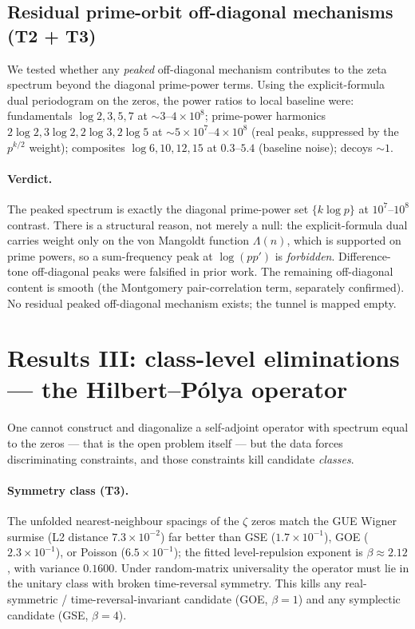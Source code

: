 \documentclass[11pt]{article}
\begin{document}
\subsection{Residual prime-orbit off-diagonal mechanisms (T2 + T3)}
\label{sec:q6}

We tested whether any \emph{peaked} off-diagonal mechanism contributes to the
zeta spectrum beyond the diagonal prime-power terms. Using the explicit-formula dual
periodogram on the zeros, the power ratios to local baseline were: fundamentals
$\log 2,3,5,7$ at $\sim 3$--$4\times10^8$; prime-power harmonics $2\log2,3\log2,2\log3,
2\log5$ at $\sim 5\times10^7$--$4\times10^8$ (real peaks, suppressed by the $p^{k/2}$
weight); composites $\log6,10,12,15$ at $0.3$--$5.4$ (baseline noise); decoys $\sim1$.

\paragraph{Verdict.} The peaked spectrum is exactly the diagonal prime-power set
$\{k\log p\}$ at $10^7$--$10^8$ contrast. There is a structural reason, not merely a
null: the explicit-formula dual carries weight only on the von Mangoldt function
$\Lambda(n)$, which is supported on prime powers, so a sum-frequency peak at
$\log(pp')$ is \emph{forbidden}. Difference-tone off-diagonal peaks were falsified in
prior work. The remaining off-diagonal content is smooth (the Montgomery pair-correlation
term, separately confirmed). No residual peaked off-diagonal mechanism exists; the tunnel
is mapped empty.

\section{Results III: class-level eliminations --- the Hilbert--Pólya operator}
\label{sec:q5}

One cannot construct and diagonalize a self-adjoint operator with spectrum equal to the
zeros --- that is the open problem itself --- but the data forces discriminating
constraints, and those constraints kill candidate \emph{classes}.

\paragraph{Symmetry class (T3).} The unfolded nearest-neighbour spacings of the $\zeta$
zeros match the GUE Wigner surmise (L2 distance $7.3\times10^{-2}$) far better than GSE
($1.7\times10^{-1}$), GOE ($2.3\times10^{-1}$), or Poisson ($6.5\times10^{-1}$); the
fitted level-repulsion exponent is $\beta\approx2.12$, with variance $0.1600$. Under
random-matrix universality the operator must lie in the unitary class with broken
time-reversal symmetry. This kills any real-symmetric / time-reversal-invariant candidate
(GOE, $\beta=1$) and any symplectic candidate (GSE, $\beta=4$).
\end{document}
